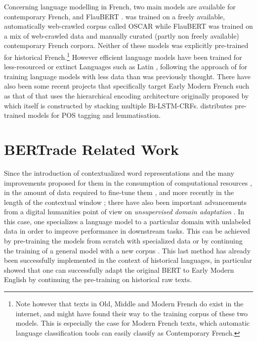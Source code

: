 Concerning language modelling in French, two main models are available for contemporary French, \camembert \cite{martin-etal-2020-camembert} and FlauBERT \cite{le-etal-2020-flaubert}. \camembert was trained on a freely available, automatically web-crawled corpus called OSCAR \cite{ortiz-suarez-etal-2019-asynchronous,ortiz-suarez-etal-2020-monolingual} while FlauBERT was trained on a mix of web-crawled data and manually curated (partly non freely available) contemporary French corpora. Neither of these models was explicitly pre-trained for historical French.\footnote{Note however that texts in Old, Middle and Modern French do exist in the internet, and might have found their way to the training corpus of these two models. This is especially the case for Modern French texts, which automatic language classification tools can easily classify as Contemporary French.} However efficient language models have been trained for less-resourced or extinct Languages such as Latin \cite{bamman-burns-2020-latin}, following the approach of  for training language models with less data than was previously thought. There have also been some recent projects that specifically target Early Modern French such as that of \pieextended \cite{clerice-2020-pie} that uses the hierarchical encoding architecture originally proposed by  which itself is constructed by stacking multiple Bi-LSTM-CRFs.  distributes pre-trained models for POS tagging and lemmatisation.

\section{BERTrade Related Work}

\label{sec-related}
Since the introduction of contextualized word representations \citep{peters-etal-2018-deep,akbik-etal-2018-contextual,devlin-etal-2019-bert} and the many improvements proposed for them in the consumption of computational resources \citep{clark-etal-2020-electra}, in the amount of data required to fine-tune them \citep{raffel-etal-2020-exploring}, and more recently in the length of the contextual window \citep{xiong-etal-2021-nystromformer}; there have also been important advancements from a digital humanities point of view on \emph{unsupervised domain adaptation} \citep{ramponi-plank-2020-neural}. In this case, one specializes a language model to a particular domain with unlabeled data in order to improve performance in downstream tasks. This can be achieved by  pre-training the models from scratch with specialized data \citep{beltagy-etal-2019-scibert} or by continuing the training of a general model with a new corpus \citep{lee-etal-2019-BioBERT, peng-etal-2019-transfer}. This last method has already been successfully implemented in the context of historical languages, in particular \citet{han-eisenstein-2019-unsupervised} showed that one can successfully adapt the original BERT \citep{devlin-etal-2019-bert} to Early Modern English by continuing the pre-training on historical raw texts.

